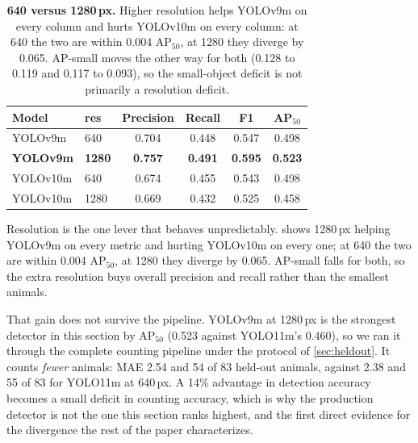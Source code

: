 \begin{table}[t]
\centering\small
\setlength{\tabcolsep}{5pt}
\begin{tabular}{llcccc}
\toprule
Model & res & Precision & Recall & F1 & AP$_{50}$ \\
\midrule
YOLOv9m & 640 & 0.704 & 0.448 & 0.547 & 0.498 \\
\textbf{YOLOv9m} & \textbf{1280} & \textbf{0.757} & \textbf{0.491} & \textbf{0.595} & \textbf{0.523} \\
YOLOv10m & 640 & 0.674 & 0.455 & 0.543 & 0.498 \\
YOLOv10m & 1280 & 0.669 & 0.432 & 0.525 & 0.458 \\
\bottomrule
\end{tabular}
\caption{\textbf{640 versus 1280\,px.} Higher resolution helps YOLOv9m on every column and
hurts YOLOv10m on every column: at 640 the two are within 0.004 AP$_{50}$, at 1280 they
diverge by 0.065. AP-small moves the other way for both (0.128 to 0.119 and 0.117 to 0.093),
so the small-object deficit is not primarily a resolution deficit.}
\label{tab:resolution}
\end{table}

Resolution is the one lever that behaves unpredictably.  shows
1280\,px helping YOLOv9m on every metric and hurting YOLOv10m on every one; at 640 the two
are within 0.004 AP$_{50}$, at 1280 they diverge by 0.065. AP-small falls for both, so the
extra resolution buys overall precision and recall rather than the smallest animals.

That gain does not survive the pipeline. YOLOv9m at 1280\,px is the strongest detector in
this section by AP$_{50}$ (0.523 against YOLO11m's 0.460), so we ran it through the complete
counting pipeline under the protocol of \cref{sec:heldout}. It counts \emph{fewer} animals:
MAE 2.54 and 54 of 83 held-out animals, against 2.38 and 55 of 83 for YOLO11m at 640\,px.
A 14\% advantage in detection accuracy becomes a small deficit in counting accuracy, which
is why the production detector is not the one this section ranks highest, and the first
direct evidence for the divergence the rest of the paper characterizes.
